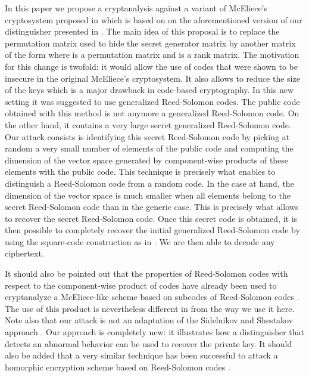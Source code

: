 \documentclass[runningheads,11pt]{llncs}
\begin{document}
\medskip





In this paper we propose a cryptanalysis against 
a variant of McEliece's cryptosystem \cite{McEliece78} proposed  in \cite{BBCRS11a} which is based on 
on the aforementioned version of our
distinguisher presented in \cite{MP12a}.
The main idea of this proposal is to replace the permutation matrix used to hide the secret generator matrix by another matrix of the form  
where  is a permutation matrix and  is a rank  matrix. 
The motivation for this change is twofold: it would allow the use of codes that were shown to be insecure 
in the original McEliece's cryptosystem. It also allows  to reduce the size of the keys which is a major drawback in code-based 
cryptography. In this new setting it was suggested  to use generalized Reed-Solomon codes. The public code obtained 
with this method is not anymore a generalized Reed-Solomon code. On the other hand, it contains a very large secret generalized Reed-Solomon code. Our attack consists is identifying this secret Reed-Solomon code by picking
at random a very small number of elements of the public code and computing the dimension of the vector space
generated by component-wise products of these elements with the public code. This technique is precisely what enables
to distinguish a Reed-Solomon code from a random code. In the case at hand, the dimension of the vector space
is much smaller when all elements belong to the secret Reed-Solomon code than in the generic case. This is precisely
what allows to recover the secret Reed-Solomon code.
 Once this secret code is obtained, it is then possible to completely recover the initial generalized Reed-Solomon code by using the 
square-code construction as in \cite{Wie10}. We are then able to decode any ciphertext.


\medskip


It should also be pointed out that the properties of Reed-Solomon codes with respect to the component-wise product of codes have 
already been used to cryptanalyze a McEliece-like scheme  \cite{BL05} based on subcodes of Reed-Solomon codes
\cite{Wie10}. The use of this product is nevertheless different in
\cite{Wie10} from the way we use it here.
Note also that our attack is not an 
adaptation of  the Sidelnikov and Shestakov approach \cite{SidelShesta92}. 
Our approach is completely new: it illustrates how a distinguisher
that detects an abnormal behavior can be used to recover the private
key. It should also be added that a very similar technique has been successful to attack \cite{GOT:eprint12} a homorphic
encryption scheme based on Reed-Solomon codes \cite{BL12}.
\end{document}
